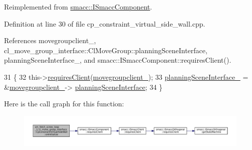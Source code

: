 Reimplemented from \hyperlink{classsmacc_1_1ISmaccComponent_ae6f71d008db12553912e9436184b9e65}{smacc\+::\+I\+Smacc\+Component}.



Definition at line 30 of file cp\+\_\+constraint\+\_\+virtual\+\_\+side\+\_\+wall.\+cpp.



References movegroupclient\+\_\+, cl\+\_\+move\+\_\+group\+\_\+interface\+::\+Cl\+Move\+Group\+::planning\+Scene\+Interface, planning\+Scene\+Interface\+\_\+, and smacc\+::\+I\+Smacc\+Component\+::requires\+Client().


\begin{DoxyCode}
31         \{
32             this->\hyperlink{classsmacc_1_1ISmaccComponent_a36c085d906fbae0fcaee817aaeafebf4}{requiresClient}(\hyperlink{classsm__fetch__screw__loop__1_1_1cl__move__group__interface_1_1CpConstraintVirtualSideWall_a6832fffc147a8a3f9206a7d76546f6b7}{movegroupclient\_});
33             \hyperlink{classsm__fetch__screw__loop__1_1_1cl__move__group__interface_1_1CpConstraintVirtualSideWall_a36d055e567438938c2355ad5ee081498}{planningSceneInterface\_} = &\hyperlink{classsm__fetch__screw__loop__1_1_1cl__move__group__interface_1_1CpConstraintVirtualSideWall_a6832fffc147a8a3f9206a7d76546f6b7}{movegroupclient\_}->
      \hyperlink{classcl__move__group__interface_1_1ClMoveGroup_a11bfab580f36e2ad32c9b37d6f58f44c}{planningSceneInterface};
34         \}
\end{DoxyCode}
Here is the call graph for this function\+:
\nopagebreak
\begin{figure}[H]
\begin{center}
\leavevmode
\includegraphics[width=350pt]{classsm__fetch__screw__loop__1_1_1cl__move__group__interface_1_1CpConstraintVirtualSideWall_a1dcf39e1ad5ddbbec29a278677a2c680_cgraph}
\end{center}
\end{figure}
\mbox{\label{classsm__fetch__screw__loop__1_1_1cl__move__group__interface_1_1CpConstraintVirtualSideWall_a86d9dd2c82600e9b175ee0e456c797a8}} 
